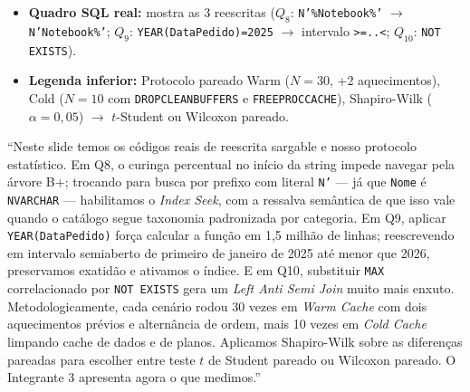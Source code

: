 \documentclass[10pt,a4paper]{article}
\begin{document}
\begin{telaBox}
  \begin{itemize}[leftmargin=14pt,itemsep=1pt,topsep=1pt]
    \item \textbf{Quadro SQL real:} mostra as 3 reescritas ($Q_8$: \texttt{N'\%Notebook\%'} $\rightarrow$ \texttt{N'Notebook\%'}; $Q_9$: \texttt{YEAR(DataPedido)=2025} $\rightarrow$ intervalo \texttt{>=..<}; $Q_{10}$: \texttt{NOT EXISTS}).
    \item \textbf{Legenda inferior:} Protocolo pareado Warm ($N=30$, +2 aquecimentos), Cold ($N=10$ com \texttt{DROPCLEANBUFFERS} e \texttt{FREEPROCCACHE}), Shapiro-Wilk ($\alpha=0{,}05$) $\rightarrow$ $t$-Student ou Wilcoxon pareado.
  \end{itemize}
\end{telaBox}

\begin{falaBox}
``Neste slide temos os códigos reais de reescrita sargable e nosso protocolo estatístico. Em Q8, o curinga percentual no início da string impede navegar pela árvore B+; trocando para busca por prefixo com literal \texttt{N'} — já que \texttt{Nome} é \texttt{NVARCHAR} — habilitamos o \emph{Index Seek}, com a ressalva semântica de que isso vale quando o catálogo segue taxonomia padronizada por categoria. Em Q9, aplicar \texttt{YEAR(DataPedido)} força calcular a função em 1,5 milhão de linhas; reescrevendo em intervalo semiaberto de primeiro de janeiro de 2025 até menor que 2026, preservamos exatidão e ativamos o índice. E em Q10, substituir \texttt{MAX} correlacionado por \texttt{NOT EXISTS} gera um \emph{Left Anti Semi Join} muito mais enxuto. Metodologicamente, cada cenário rodou 30 vezes em \emph{Warm Cache} com dois aquecimentos prévios e alternância de ordem, mais 10 vezes em \emph{Cold Cache} limpando cache de dados e de planos. Aplicamos Shapiro-Wilk sobre as diferenças pareadas para escolher entre teste $t$ de Student pareado ou Wilcoxon pareado. O Integrante 3 apresenta agora o que medimos.''
\end{falaBox}
\end{document}
